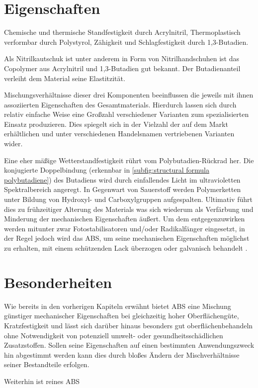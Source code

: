     \section{Eigenschaften}
            Chemische und thermische Standfestigkeit durch Acrylnitril, Thermoplastisch verformbar durch Polystyrol, Zähigkeit
            und Schlagfestigkeit durch 1,3-Butadien.
            
            Als Nitrilkautschuk ist unter anderem in Form von Nitrilhandschuhen ist das Copolymer aus Acrylnitril und
            1,3-Butadien gut bekannt. Der Butadienanteil verleiht dem Material seine Elastitzität.

            Mischungsverhältnisse dieser drei Komponenten beeinflussen die jeweils mit ihnen assoziierten Eigenschaften des
            Gesamtmaterials. Hierdurch lassen sich durch relativ einfache Weise eine Großzahl verschiedener Varianten zum
            spezialisierten Einsatz produzieren. Dies spiegelt sich in der Vielzahl der auf dem Markt erhältlichen und unter
            verschiedenen Handelsnamen vertriebenen Varianten wider.

            Eine eher mäßige Wetterstandfestigkeit rührt vom Polybutadien-Rückrad her. Die konjugierte Doppelbindung (erkennbar
            in \cref{subfig:structural formula polybutadiene}) des
            Butadiens wird durch einfallendes Licht im ultravioletten Spektralbereich angeregt. In Gegenwart von Sauerstoff
            werden Polymerketten unter Bildung von Hydroxyl- und Carboxylgruppen aufgespalten. Ultimativ führt dies zu
            frühzeitiger Alterung des Materials was sich wiederum als Verfärbung und Minderung der mechanischen Eigenschaften äußert.
            Um dem entgegenzuwirken werden mitunter zwar Fotostabilisatoren und/oder Radikalfänger eingesetzt, in der 
            Regel jedoch wird das ABS, um seine mechanischen Eigenschaften möglichst zu erhalten, mit einem schützenden Lack
            überzogen oder galvanisch behandelt \cite{Thermal.and.Photo-Degradation.of.Unstabilized.ABS.Adeniyi.1984,Domininghaus.1998.Kunststoffe.und.ihre.Eigenschaften}.
    \section{Besonderheiten}
            Wie bereits in den vorherigen Kapiteln erwähnt bietet ABS eine Mischung günstiger mechanischer Eigenschaften
            bei gleichzeitig hoher Oberflächengüte, Kratzfestigkeit und lässt sich darüber hinaus besonders gut oberflächenbehandeln
            ohne  Notwendigkeit von potenziell umwelt- oder gesundheitsschädlichen Zusatzstoffen. Sollen seine
            Eigenschaften auf einen bestimmten Anwendungszweck hin abgestimmt werden kann dies durch bloßes Ändern der
            Mischverhältnisse seiner Bestandteile erfolgen.

            Weiterhin ist reines ABS 
